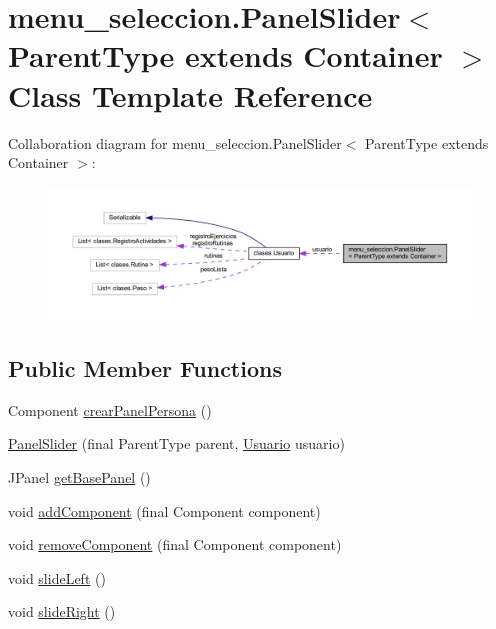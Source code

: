 \hypertarget{classmenu__seleccion_1_1_panel_slider}{}\section{menu\+\_\+seleccion.\+Panel\+Slider$<$ Parent\+Type extends Container $>$ Class Template Reference}
\label{classmenu__seleccion_1_1_panel_slider}


Collaboration diagram for menu\+\_\+seleccion.\+Panel\+Slider$<$ Parent\+Type extends Container $>$\+:
\nopagebreak
\begin{figure}[H]
\begin{center}
\leavevmode
\includegraphics[width=350pt]{classmenu__seleccion_1_1_panel_slider__coll__graph}
\end{center}
\end{figure}
\subsection*{Public Member Functions}
\begin{DoxyCompactItemize}
\item 
Component \mbox{\hyperlink{classmenu__seleccion_1_1_panel_slider_ac08af6fbde0b2c7dd9faadf96b2f42b9}{crear\+Panel\+Persona}} ()
\item 
\mbox{\hyperlink{classmenu__seleccion_1_1_panel_slider_ae9eb1a7625a965ddb124dd09cb4fa2fd}{Panel\+Slider}} (final Parent\+Type parent, \mbox{\hyperlink{classclases_1_1_usuario}{Usuario}} usuario)
\item 
J\+Panel \mbox{\hyperlink{classmenu__seleccion_1_1_panel_slider_a1eb5380941a00a4cfac9d1ebb9d9fc6e}{get\+Base\+Panel}} ()
\item 
void \mbox{\hyperlink{classmenu__seleccion_1_1_panel_slider_a785cef2aa278e747968467512334debe}{add\+Component}} (final Component component)
\item 
void \mbox{\hyperlink{classmenu__seleccion_1_1_panel_slider_a8157aedd9b08d86a16c808caaae13f3f}{remove\+Component}} (final Component component)
\item 
void \mbox{\hyperlink{classmenu__seleccion_1_1_panel_slider_a8d9bc3adce84f2fe70cec96343e6bde8}{slide\+Left}} ()
\item 
void \mbox{\hyperlink{classmenu__seleccion_1_1_panel_slider_a576cb7fd35ba8988ccb55786fd3f3b96}{slide\+Right}} ()
\end{DoxyCompactItemize}


